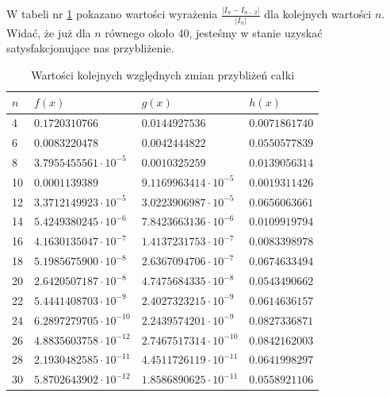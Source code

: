 \documentclass{article}
\begin{document}
    W tabeli nr \ref{tab:errestimations} pokazano wartości wyrażenia
    $\frac{|I_n - I_{n-2}|}{|I_{n}|}$ dla kolejnych wartości $n$. Widać, że już dla
    $n$ równego około 40, jesteśmy w stanie uzyskać satysfakcjonujące nas przybliżenie.
  \begin{table}[htb]
    \centering
    \caption{Wartości kolejnych względnych zmian przybliżeń całki}
    \label{tab:errestimations}
    \begin{tabular}{|l|l|l|l|}
      \hline
      $n$ & $f(x)$                        & $g(x)$                        & $h(x)$                       \\ \hline
      4   & $0.1720310766$                & $0.0144927536$                & $0.0071861740$               \\
      6   & $0.0083220478$                & $0.0042444822$                & $0.0550577839$               \\
      8   & $3.7955455561 \cdot 10^{-5} $ & $0.0010325259$                & $0.0139056314$               \\
      10  & $0.0001139389$                & $9.1169963414 \cdot 10^{-5} $ & $0.0019311426$               \\
      12  & $3.3712149923 \cdot 10^{-5} $ & $3.0223906987 \cdot 10^{-5} $ & $0.0656063661$               \\
      14  & $5.4249380245 \cdot 10^{-6} $ & $7.8423663136 \cdot 10^{-6} $ & $0.0109919794$               \\
      16  & $4.1630135047 \cdot 10^{-7} $ & $1.4137231753 \cdot 10^{-7} $ & $0.0083398978$               \\
      18  & $5.1985675900 \cdot 10^{-8} $ & $2.6367094706 \cdot 10^{-7} $ & $0.0674633494$               \\
      20  & $2.6420507187 \cdot 10^{-8} $ & $4.7475684335 \cdot 10^{-8} $ & $0.0543490662$               \\
      22  & $5.4441408703 \cdot 10^{-9} $ & $2.4027323215 \cdot 10^{-9} $ & $0.0614636157$               \\
      24  & $6.2897279705 \cdot 10^{-10}$ & $2.2439574201 \cdot 10^{-9} $ & $0.0827336871$               \\
      26  & $4.8835603758 \cdot 10^{-12}$ & $2.7467517314 \cdot 10^{-10}$ & $0.0842162003$               \\
      28  & $2.1930482585 \cdot 10^{-11}$ & $4.4511726119 \cdot 10^{-11}$ & $0.0641998297$               \\
      30  & $5.8702643902 \cdot 10^{-12}$ & $1.8586890625 \cdot 10^{-11}$ & $0.0558921106$               \\

\end{tabular}
\end{table}
\end{document}
